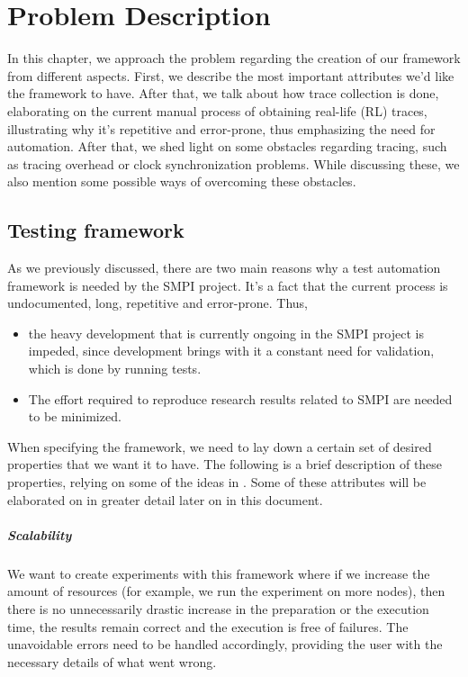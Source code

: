 
\chapter{Problem Description}
\label{Chapter3}

In this chapter, we approach the problem regarding the creation of our
framework from different aspects. First, we describe the most
important attributes we'd like the framework to have. After that, we
talk about how trace collection is done, elaborating on the current
manual process of obtaining real-life (RL) traces, illustrating why
it's repetitive and error-prone, thus emphasizing the need for
automation. After that, we shed light on some obstacles regarding
tracing, such as tracing overhead or clock synchronization
problems. While discussing these, we also mention some possible ways
of overcoming these obstacles.
\section{Testing framework}
As we previously discussed, there are two main reasons why a test
automation framework is needed by the SMPI project. It's a fact that
the current process is undocumented, long, repetitive and
error-prone. Thus,
\begin{itemize}
\item the heavy development that is currently ongoing in the SMPI
  project is impeded, since development brings with it a constant need
  for validation, which is done by running tests.
\item The effort required to reproduce research results related to
  SMPI are needed to be minimized.
\end{itemize}
When specifying the framework, we need to lay down a certain
set of desired properties that we want it to have. The
following is a brief description of these properties, relying on some
of the ideas in \cite{bn12_1}. Some of these attributes will be
elaborated on in greater detail later on in this document.
\paragraph{Scalability}
We want to create experiments with this framework where if we increase
the amount of resources (for example, we run the experiment on more
nodes), then there is no unnecessarily drastic increase in the
preparation or the execution time, the results remain correct and the
execution is free of failures. The unavoidable errors need to be
handled accordingly, providing the user with the necessary details of
what went wrong.
